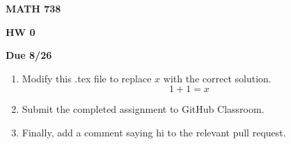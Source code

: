 \documentclass[12pt]{amsart}
\begin{document}
\centerline{\bf MATH 738}
\centerline{\bf HW 0} 
\centerline{\bf Due 8/26}

\vspace{2em}

\begin{enumerate}
    \item Modify this .tex file to replace $x$ with the correct solution. 
    \begin{displaymath}
        1+1 = x
    \end{displaymath}
    \item Submit the completed assignment to GitHub Classroom. 
    \item Finally, add a comment saying hi to the relevant pull request. 
\end{enumerate}
\end{document}
